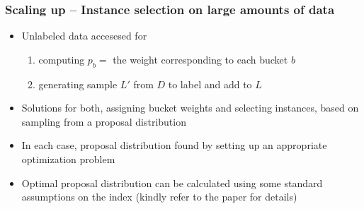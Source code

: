 \documentclass[11pt]{beamer}
\newcommand{\wt}{{p}}
\newlength{\wideitemsep}
\let\olditem\item
\renewcommand{\item}{\setlength{\itemsep}{\wideitemsep}\olditem}
\begin{document}
\begin{frame}
\frametitle{Scaling up -- Instance selection on large amounts of data} 
\begin{itemize}
\pause
\item Unlabeled data accesesed for 
\begin{enumerate}
\item computing $\wt_b=$ the weight corresponding to each bucket $b$ 
\item generating sample $L'$ from $D$ to label and add to $L$
\end{enumerate}
\vspace{1mm}
\pause
\item Solutions for both, assigning bucket weights and selecting instances, based on sampling from a proposal distribution
\vspace{1mm} \pause
\item In each case, proposal distribution found by setting up an appropriate optimization problem
\pause
\item Optimal proposal distribution can be calculated using some standard assumptions on the index (kindly refer to the paper for details)
\end{itemize}
\end{frame}

\end{document}
